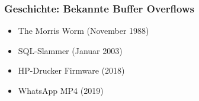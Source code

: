 \begin{frame}
    \frametitle{Geschichte: Bekannte Buffer Overflows}
\begin{itemize}
    \item The Morris Worm (November 1988)
    \item SQL-Slammer (Januar 2003)
    \item HP-Drucker Firmware (2018)
    \item WhatsApp MP4 (2019)
\end{itemize}
\end{frame}
    
